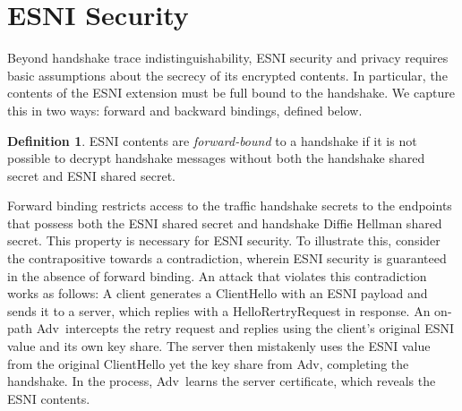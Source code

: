 \documentclass{article}
\newcommand{\adv}{{\sf Adv}}
\theoremstyle{definition}
\newtheorem{definition}{Definition}[section]
\begin{document}

\section{ESNI Security}

Beyond handshake trace indistinguishability, ESNI security and privacy requires basic assumptions
about the secrecy of its encrypted contents. In particular, the contents of the ESNI extension must
be full bound to the handshake. We capture this in two ways: forward and backward bindings, defined 
below.

\begin{definition}
ESNI contents are \emph{forward-bound} to a handshake if it is not possible to decrypt handshake messages 
without both the handshake shared secret and ESNI shared secret.
\end{definition}

Forward binding restricts access to the traffic handshake secrets to the endpoints that possess both
the ESNI shared secret and handshake Diffie Hellman shared secret. This property is necessary for 
ESNI security. To illustrate this, consider the contrapositive towards a contradiction, wherein ESNI 
security is guaranteed in the absence of forward binding. An attack that violates this contradiction works 
as follows: A client generates a ClientHello with an ESNI payload and sends it to a server, which replies 
with a HelloRertryRequest in response. An on-path \adv\ intercepts the retry request and replies using
the client's original ESNI value and its own key share. The server then mistakenly uses the ESNI
value from the original ClientHello yet the key share from \adv, completing the handshake. In the
process, \adv\ learns the server certificate, which reveals the ESNI contents.
\end{document}
